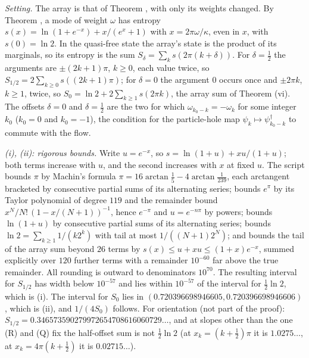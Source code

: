 \emph{Setting.} The array is that of Theorem , with only its weights changed. By Theorem , a mode of weight $\omega$ has entropy $s(x) = \ln(1 + e^{-x}) + x/(e^{x} + 1)$ with $x = 2\pi\omega/\kappa$, even in $x$, with $s(0) = \ln 2$. In the quasi-free state the array's state is the product of its marginals, so its entropy is the sum $S_{\delta} = \sum_{k}s(2\pi(k + \delta))$. For $\delta = \tfrac12$ the arguments are $\pm(2k + 1)\pi$, $k \geq 0$, each value twice, so $S_{1/2} = 2\sum_{k \geq 0}s((2k + 1)\pi)$; for $\delta = 0$ the argument $0$ occurs once and $\pm 2\pi k$, $k \geq 1$, twice, so $S_{0} = \ln 2 + 2\sum_{k \geq 1}s(2\pi k)$, the array sum of Theorem (vi). The offsets $\delta = 0$ and $\delta = \tfrac12$ are the two for which $\omega_{k_{0} - k} = -\omega_{k}$ for some integer $k_{0}$ ($k_{0} = 0$ and $k_{0} = -1$), the condition for the particle-hole map $\psi_{k} \mapsto \psi_{k_{0} - k}^{\dagger}$ to commute with the flow.

\emph{(i), (ii): rigorous bounds.} Write $u = e^{-x}$, so $s = \ln(1 + u) + xu/(1 + u)$; both terms increase with $u$, and the second increases with $x$ at fixed $u$. The script bounds $\pi$ by Machin's formula $\pi = 16\arctan\tfrac15 - 4\arctan\tfrac{1}{239}$, each arctangent bracketed by consecutive partial sums of its alternating series; bounds $e^{\pi}$ by its Taylor polynomial of degree $119$ and the remainder bound $x^{N}/N!\,(1 - x/(N + 1))^{-1}$, hence $e^{-\pi}$ and $u = e^{-n\pi}$ by powers; bounds $\ln(1 + u)$ by consecutive partial sums of its alternating series; bounds $\ln 2 = \sum_{k \geq 1}1/(k2^{k})$ with tail at most $1/((N + 1)2^{N})$; and bounds the tail of the array sum beyond $26$ terms by $s(x) \le u + xu \le (1 + x)e^{-x}$, summed explicitly over $120$ further terms with a remainder $10^{-60}$ far above the true remainder. All rounding is outward to denominators $10^{70}$. The resulting interval for $S_{1/2}$ has width below $10^{-57}$ and lies within $10^{-57}$ of the interval for $\tfrac12\ln 2$, which is (i). The interval for $S_{0}$ lies in $(0.720396698946605, 0.720396698946606)$, which is (ii), and $1/(4S_{0})$ follows. For orientation (not part of the proof): $S_{1/2} = 0.346573590279972654708616060729\ldots$, and at slopes other than the one (R) and (Q) fix the half-offset sum is not $\tfrac12\ln 2$ (at $x_{k} = (k + \tfrac12)\pi$ it is $1.0275\ldots$, at $x_{k} = 4\pi(k + \tfrac12)$ it is $0.02715\ldots$).

